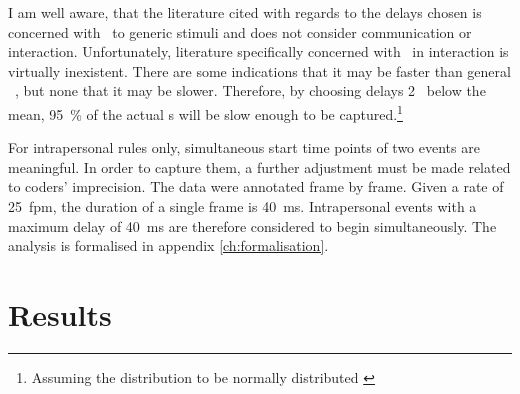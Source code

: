 I am well aware, that the literature cited with regards to the delays chosen is concerned with \rt\ to generic stimuli and does not consider communication or interaction. Unfortunately, literature specifically concerned with \rt\ in interaction is virtually inexistent. There are some indications that it may be faster than general \rt\ \citep{levinson16}, but none that it may be slower. Therefore, by choosing delays 2 \sd\ below the mean, 95~\% of the actual \rt s will be slow enough to be captured.\footnote{Assuming the distribution to be normally distributed \citep[]{moore16}} 

For intrapersonal rules only, simultaneous start time points of two events are meaningful. In order to capture them, a further adjustment must be made related to coders' imprecision. The data were annotated frame by frame. Given a rate of 25~fpm, the duration of a single frame is 40~ms. Intrapersonal events with a maximum delay of 40~ms are therefore considered to begin simultaneously. The analysis is formalised in appendix \ref{ch:formalisation}.

\section{Results}
\label{sec:miningresults}



































